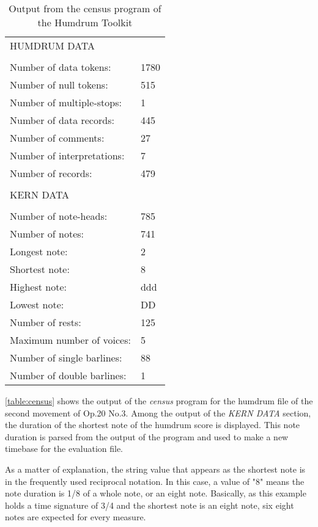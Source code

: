 		\begin{table}[tbp]
		\centering
		\begin{tabular}{ll}
		HUMDRUM DATA &  \\
		 &  \\
		Number of data tokens: & 1780 \\
		Number of null tokens: & 515 \\
		Number of multiple-stops: & 1 \\
		Number of data records: & 445 \\
		Number of comments: & 27 \\
		Number of interpretations: & 7 \\
		Number of records: & 479 \\
		 &  \\
		KERN DATA &  \\
		 &  \\
		Number of note-heads: & 785 \\
		Number of notes: & 741 \\
		Longest note: & 2 \\
		Shortest note: & 8 \\
		Highest note: & ddd \\
		Lowest note: & DD \\
		Number of rests: & 125 \\
		Maximum number of voices: & 5 \\
		Number of single barlines: & 88 \\
		Number of double barlines: & 1
		\end{tabular}
		\caption{Output from the census program of the Humdrum Toolkit}
		\label{table:census}
		\end{table}

		\autoref{table:census} shows the output of the \emph{census} program for the humdrum file of the second movement of Op.20 No.3. Among the output of the \emph{KERN DATA} section, the duration of the shortest note of the humdrum score is displayed. This note duration is parsed from the output of the program and used to make a new timebase for the evaluation file.

		As a matter of explanation, the string value that appears as the shortest note is in the frequently used reciprocal notation. In this case, a value of "8" means the note duration is 1/8 of a whole note, or an eight note. Basically, as this example holds a time signature of 3/4 and the shortest note is an eight note, six eight notes are expected for every measure.

